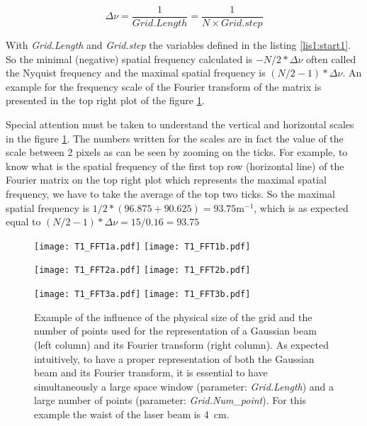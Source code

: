 \begin{equation}
 \Delta \nu = \frac{1}{Grid.Length} =\frac{1}{N \times Grid.step}
\end{equation}

With \emph{Grid.Length} and \emph{Grid.step} the variables defined in the listing \ref{lis1:start1}. So the minimal (negative) spatial frequency calculated is $- N/2 *\Delta \nu$ often called the Nyquist frequency and the maximal spatial frequency is $(N/2-1) *\Delta \nu$. An example for the frequency scale of the Fourier transform of the matrix is presented in the top right plot of the figure \ref{fig1:FFT}.

Special attention must be taken to understand the vertical and horizontal scales in the figure \ref{fig1:FFT}. The numbers written for the scales are in fact the value of the scale between 2 pixels as can be seen by zooming on the ticks. For example, to know what is the spatial frequency of the first top row (horizontal line) of the Fourier matrix on the top right plot which represents the maximal spatial frequency, we have to take the average of the top two ticks. So the maximal spatial frequency is $1/2*(96.875 + 90.625) = 93.75 \textrm{m}^{-1}$, which is as expected equal to $(N/2-1) *\Delta \nu = 15/0.16 = 93.75 $\\



\begin{figure}
\begin{center}
\texttt{[image: T1\_FFT1a.pdf]}\hfill
\texttt{[image: T1\_FFT1b.pdf]}

\texttt{[image: T1\_FFT2a.pdf]}\hfill
\texttt{[image: T1\_FFT2b.pdf]}

\texttt{[image: T1\_FFT3a.pdf]}\hfill
\texttt{[image: T1\_FFT3b.pdf]}

\end{center}
\vspace*{-0.8cm}
\caption{\label{fig1:FFT} Example of the influence of the physical size of the grid and the number of points used for the representation of a Gaussian beam (left column) and its Fourier transform (right column). As expected intuitively, to have a proper representation of both the Gaussian beam and its Fourier transform, it is essential to have simultaneously a large space window (parameter: \textsl{Grid.Length}) and a large number of points (parameter: \textsl{Grid.Num\_point}). For this example the waist of the laser beam is 4~cm. }
\end{figure}

